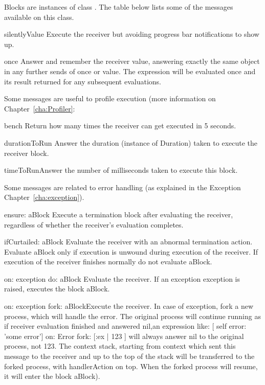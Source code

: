 \documentclass[a4paper,10pt,twoside]{book}
\begin{document}
Blocks are instances of class . The table below lists some of the messages available on this class. 
\begin{description}
\item{\textsf{silentlyValue}} Execute the receiver but avoiding progress bar notifications to show up.

\item{\textsf{once}} Answer and remember the receiver value, answering exactly the same object in any further sends of once or value. The expression will be evaluated once and its result returned for any subsequent evaluations.
\end{description}

Some messages are useful to profile execution (more information on Chapter~\ref{cha:Profiler}: 

\begin{description}
\item{\textsf{bench}} Return how many times the receiver can get executed in 5 seconds. 

\item{\textsf{durationToRun}} Answer the duration (instance of Duration) taken to execute the receiver block.

\item{\textsf{timeToRun}}Answer the number of milliseconds taken to execute this block.
\end{description}


Some messages are related to error handling (as explained in the Exception Chapter~\ref{cha:exception}).

\begin{description}
\item{\textsf{ensure: aBlock}} Execute a termination block after evaluating the receiver, regardless of whether the receiver's evaluation completes.  
\item{\textsf{ifCurtailed: aBlock}} Evaluate the receiver with an abnormal termination action. Evaluate aBlock only if execution is unwound during execution of the receiver. If execution of the receiver finishes normally do not evaluate aBlock. 

\item{\textsf{on: exception do: aBlock}} Evaluate the receiver. If an exception \textsf{exception} is raised, executes the block \textsf{aBlock}.

\item{\textsf{on: exception fork: aBlock}}Execute the receiver. In case of exception, fork a new process, which will handle the error. The original process will continue running as if receiver evaluation finished and answered nil,\ie  an expression like: \textsf{[ self error: 'some error'] on: Error fork: [:ex |  123 ]} will always answer nil to the original process, not 123. The context stack, starting from context which sent this message to the receiver and up to the top of the stack will be transferred to the forked process, with handlerAction on top. When the forked process will resume, it will enter the block \textsf{aBlock}).
\end{description}
\end{document}
